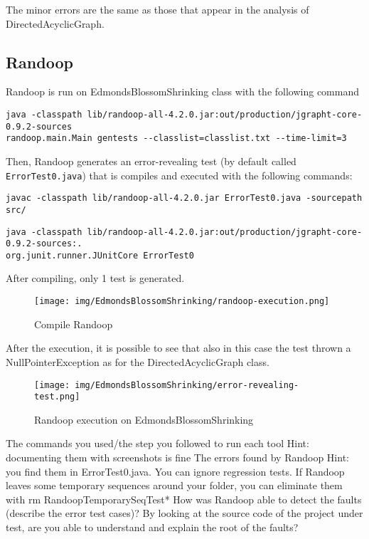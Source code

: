 \documentclass[a4paper,12pt]{article} %
\begin{document}
	The minor errors are the same as those that appear in the analysis of DirectedAcyclicGraph.
		
	\subsection*{Randoop}
	Randoop is run on EdmondsBlossomShrinking class with the following command
	
	\begin{lstlisting}[style=DOS,caption={Randoop Execution}, captionpos=b]
java -classpath lib/randoop-all-4.2.0.jar:out/production/jgrapht-core-0.9.2-sources 
randoop.main.Main gentests --classlist=classlist.txt --time-limit=3
	\end{lstlisting}
	
	Then, Randoop generates an error-revealing test (by default called \\ \texttt{ErrorTest0.java}) that is compiles and executed with the following commands:
	\begin{lstlisting}[style=DOS,caption={Compile Error Revealing Test}, captionpos=b]
javac -classpath lib/randoop-all-4.2.0.jar ErrorTest0.java -sourcepath src/
	\end{lstlisting}
	
	\begin{lstlisting}[style=DOS,caption={Execute Error Revealing Test}, captionpos=b]
java -classpath lib/randoop-all-4.2.0.jar:out/production/jgrapht-core-0.9.2-sources:. 
org.junit.runner.JUnitCore ErrorTest0
	\end{lstlisting}	
	
After compiling, only 1 test is generated.
	\begin{figure}[H]
		\centering
		\texttt{[image: img/EdmondsBlossomShrinking/randoop-execution.png]}
		\caption{Compile Randoop}
		\label{fig:randexe-ed}
	\end{figure}
	
	After the execution, it is possible to see that also in this case the test thrown a NullPointerException as for the DirectedAcyclicGraph class.
	\begin{figure}[H]
		\centering
		\texttt{[image: img/EdmondsBlossomShrinking/error-revealing-test.png]}	
		\caption{Randoop execution on EdmondsBlossomShrinking}
		\label{fig:randtest-ed}
	\end{figure}
	
	
	
	
The commands you used/the step you followed to run each tool 
Hint: documenting them with screenshots is fine 
The errors found by Randoop
Hint: you find them in ErrorTest0.java. You can ignore regression tests. If Randoop leaves some temporary sequences around your folder, you can eliminate them with rm RandoopTemporarySeqTest*
How was Randoop able to detect the faults (describe the error test cases)? By looking at the source code of the project under test, are you able to understand and explain the root of the faults?
	
\end{document}
